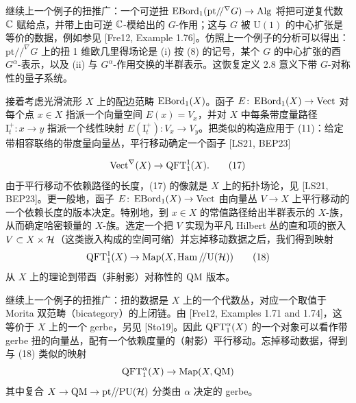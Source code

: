 \begin{example}[2.19（射影 $G$-表示）]
继续上一个例子的扭推广：一个可逆扭 $\operatorname{EBord}_1(\mathrm{pt}/\!/^{\nabla}G)\to\operatorname{Alg}$ 将把可逆复代数 $\mathbb{C}$ 赋给点，并带上由可逆 $\mathbb{C}$-模给出的 $G$-作用；这与 $G$ 被 $\mathrm{U}(1)$ 的中心扩张是等价的数据，例如参见 [Fre12, Example 1.76]。仿照上一个例子的分析可以得出：$\mathrm{pt}/\!/^{\nabla}G$ 上的扭 1 维欧几里得场论是 (i) 按 (8) 的记号，某个 $G$ 的中心扩张的酉 $G^{\alpha}$-表示，以及 (ii) 与 $G^{\alpha}$-作用交换的半群表示。这恢复定义 2.8 意义下带 $G$-对称性的量子系统。
\end{example}

\begin{example}[2.20（带联络的向量丛）]
{\sloppy
接着考虑光滑流形 $X$ 上的配边范畴 $\operatorname{EBord}_1(X)$。函子 $E\colon\operatorname{EBord}_1(X)\to\operatorname{Vect}$ 对每个点 $x\in X$ 指派一个向量空间 $E(x)=V_x$，并对 $X$ 中每条带度量路径 $\mathrm{I}^{+}_t\colon x\to y$ 指派一个线性映射 $E(\mathrm{I}^{+}_t)\colon V_x\to V_y$。把类似的构造应用于 (11)：给定带相容联络的带度量向量丛，平行移动确定一个函子 [LS21, BEP23]\par}
\begin{equation}
\operatorname{Vect}^{\nabla}(X)\to\operatorname{QFT}^{1}_{1}(X).
\tag{17}
\end{equation}
由于平行移动不依赖路径的长度，(17) 的像就是 $X$ 上的拓扑场论，见 [LS21, BEP23]。更一般地，函子 $E\colon\operatorname{EBord}_1(X)\to\operatorname{Vect}$ 由向量丛 $V\to X$ 上平行移动的一个依赖长度的版本决定。特别地，到 $x\in X$ 的常值路径给出半群表示的 $X$-族，从而确定哈密顿量的 $X$-族。选定一个把 $V$ 实现为平凡 Hilbert 丛的直和项的嵌入 $V\subset X\times\mathcal{H}$（这类嵌入构成的空间可缩）并忘掉移动数据之后，我们得到映射
\begin{equation}
\operatorname{QFT}^{1}_{1}(X)\to\mathrm{Map}(X,\operatorname{Ham}/\!/\mathrm{U}(\mathcal{H}))
\tag{18}
\end{equation}
从 $X$ 上的理论到带酉（非射影）对称性的 $\operatorname{QM}$ 版本。
\end{example}

\begin{example}
继续上一个例子的扭推广：扭的数据是 $X$ 上的一个代数丛，对应一个取值于 Morita 双范畴（bicategory）的上闭链。由 [Fre12, Examples 1.71 and 1.74]，这等价于 $X$ 上的一个 gerbe，另见 [Sto19]。因此 $\operatorname{QFT}^{\alpha}_{1}(X)$ 的一个对象可以看作带 gerbe 扭的向量丛，配有一个依赖度量的（射影）平行移动。忘掉移动数据，得到与 (18) 类似的映射
\[
\operatorname{QFT}^{\alpha}_{1}(X)\to\mathrm{Map}(X,\operatorname{QM})
\]
其中复合 $X\to\operatorname{QM}\to\mathrm{pt}/\!/\mathrm{PU}(\mathcal{H})$ 分类由 $\alpha$ 决定的 gerbe。
\end{example}

